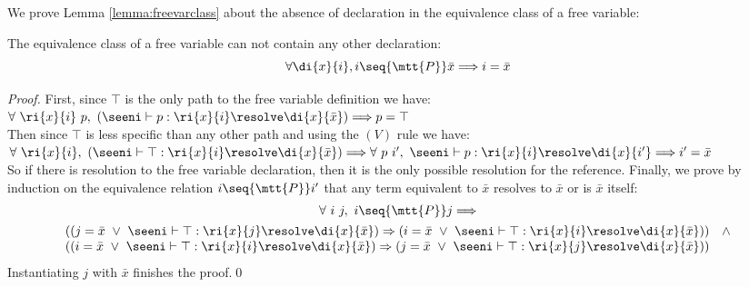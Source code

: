 We prove Lemma \ref{lemma:freevarclass} about the absence of declaration in the equivalence class of a free variable:
\begin{lemma} The equivalence class of a free variable can not contain any other declaration:
\begin{equation*}
\forall \di{x}{i}, i \seq{\mtt{P}} \bar{x} \Longrightarrow i = \bar{x}
\end{equation*}
\end{lemma}
\begin{proof}
  First, since $\top$ is the only path to the free variable definition we have:\\ 
  \tab$\forall\ \ri{x}{i}\ p,\ (\seeni \vdash p : \ri{x}{i} \resolve \di{x}{\bar{x}}) \Longrightarrow p = \top$\\
  Then since $\top$ is less specific than any other path and using the $(V)$ rule we have: 
  \tab$\forall\ \ri{x}{i},\ (\seeni \vdash \top : \ri{x}{i} \resolve \di{x}{\bar{x}}) \Longrightarrow \forall\ p\ i',\ \seeni \vdash p : \ri{x}{i} \resolve \di{x}{i'} \Longrightarrow i' = \bar{x}$\\
  So if there is resolution to the free variable declaration, then it is the only possible resolution for the reference. Finally, we prove by induction on the equivalence relation $i \seq{\mtt{P}} i'$ that any term
equivalent to $\bar{x}$ resolves to $\bar{x}$ or is $\bar{x}$ itself:
  \begin{multline*}
    \forall\ i\ j,\ i \seq{\mtt{P}} j \Longrightarrow\\
    \begin{array}{rl}
    ((j = \bar{x}\ \vee\ \seeni \vdash \top : \ri{x}{j} \resolve \di{x}{\bar{x}}) \Rightarrow (i = \bar{x}\ \vee\ \seeni \vdash \top : \ri{x}{i} \resolve \di{x}{\bar{x}})) & \wedge \\
    ((i = \bar{x}\ \vee\ \seeni \vdash \top : \ri{x}{i} \resolve \di{x}{\bar{x}}) \Rightarrow (j = \bar{x}\ \vee\ \seeni \vdash \top : \ri{x}{j} \resolve \di{x}{\bar{x}}))
    \end{array}
  \end{multline*}
Instantiating $j$ with $\bar{x}$ finishes the proof.\qed
\end{proof}
\endinput


\endinput

Let us now prove an equivalent definition of $\paths{V}{\seeni}{\seens}{S}$ stating that the paths in $\paths{V}{\seeni}{\seens}{S}$ are exactly
the resolution paths from S:

